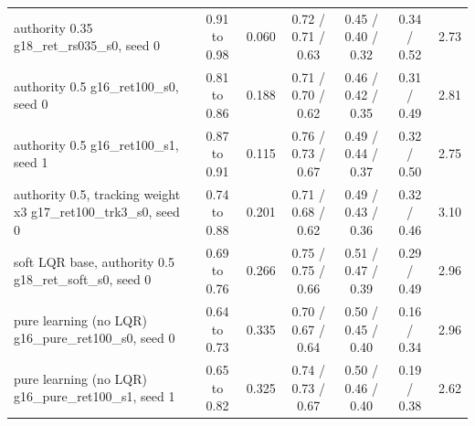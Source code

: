 \begin{table}[t]
{\begin{tabular}{lcccccc}
authority 0.35 g18\_ret\_rs035\_s0, seed 0 & 0.91 to 0.98 & 0.060 & 0.72 / 0.71 / 0.63 & 0.45 / 0.40 / 0.32 & 0.34 / 0.52 & 2.73\\
authority 0.5 g16\_ret100\_s0, seed 0 & 0.81 to 0.86 & 0.188 & 0.71 / 0.70 / 0.62 & 0.46 / 0.42 / 0.35 & 0.31 / 0.49 & 2.81\\
authority 0.5 g16\_ret100\_s1, seed 1 & 0.87 to 0.91 & 0.115 & 0.76 / 0.73 / 0.67 & 0.49 / 0.44 / 0.37 & 0.32 / 0.50 & 2.75\\
authority 0.5, tracking weight x3 g17\_ret100\_trk3\_s0, seed 0 & 0.74 to 0.88 & 0.201 & 0.71 / 0.68 / 0.62 & 0.49 / 0.43 / 0.36 & 0.32 / 0.46 & 3.10\\
soft LQR base, authority 0.5 g18\_ret\_soft\_s0, seed 0 & 0.69 to 0.76 & 0.266 & 0.75 / 0.75 / 0.66 & 0.51 / 0.47 / 0.39 & 0.29 / 0.49 & 2.96\\
pure learning (no LQR) g16\_pure\_ret100\_s0, seed 0 & 0.64 to 0.73 & 0.335 & 0.70 / 0.67 / 0.64 & 0.50 / 0.45 / 0.40 & 0.16 / 0.34 & 2.96\\
pure learning (no LQR) g16\_pure\_ret100\_s1, seed 1 & 0.65 to 0.82 & 0.325 & 0.74 / 0.73 / 0.67 & 0.50 / 0.46 / 0.40 & 0.19 / 0.38 & 2.62\\
\bottomrule\end{tabular}}
\end{table}
